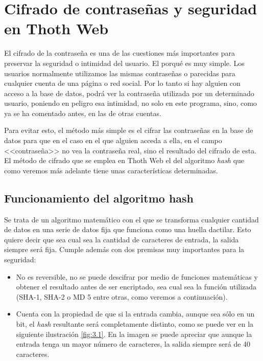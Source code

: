 \section{Cifrado de contraseñas y seguridad en Thoth Web}

El cifrado de la contraseña es una de las cuestiones más importantes para preservar la seguridad o intimidad del usuario. El porqué es muy simple. Los usuarios normalmente utilizamos las mismas contraseñas o parecidas para cualquier cuenta de una página o red social. Por lo tanto si hay alguien con acceso a la base de datos, podrá ver la contraseña utilizada por un determinado usuario, poniendo en peligro esa intimidad, no solo en este programa, sino, como ya se ha comentado antes, en las de otras cuentas.

Para evitar esto, el método más simple es el cifrar las contraseñas en la base de datos para que en el caso en el que alguien acceda a ella, en el campo <<contraseña>> no vea la contraseña real, sino el resultado del cifrado de esta. El método de cifrado que se emplea en Thoth Web el del algoritmo \emph{hash} que como veremos más adelante tiene unas características determinadas. 

\subsection{Funcionamiento del algoritmo hash}

Se trata de un algoritmo matemático con el que se transforma cualquier cantidad de datos en una serie de datos fija que funciona como una huella dactilar. Esto quiere decir que sea cual sea la cantidad de caracteres de entrada, la salida siempre será fija. Cumple además con dos premisas muy importantes para la seguridad: 

\begin{itemize}
\item No es reversible, no se puede descifrar por medio de funciones matemáticas y obtener el resultado antes de ser encriptado, sea cual sea la función utilizada (SHA-1, SHA-2 o MD 5 entre otras, como veremos a continuación).
\item Cuenta con la propiedad de que si la entrada cambia, aunque sea sólo en un bit, el \emph{hash} resultante será completamente distinto, como se puede ver en la siguiente ilustración \ref{fig:3.1}. En la imagen se puede apreciar que aunque la entrada tenga un mayor número de caracteres, la salida siempre será de 40 caracteres.

\end{itemize} 


